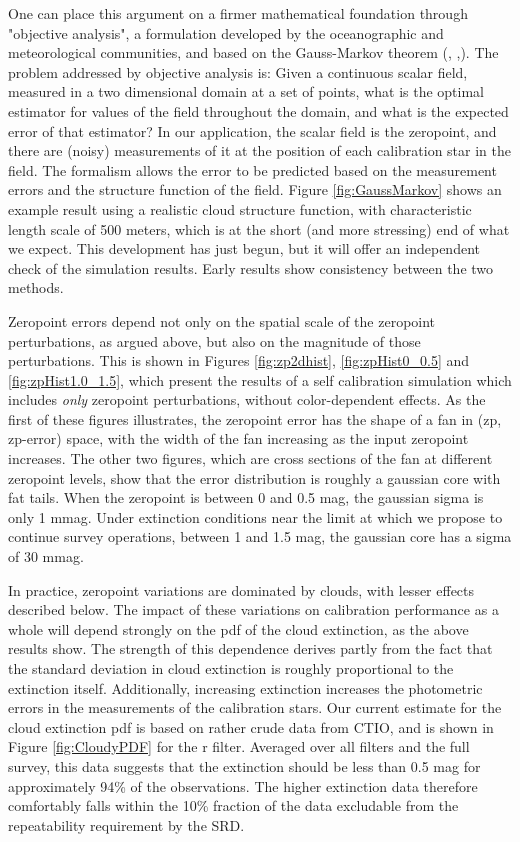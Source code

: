 \documentclass[12pt,preprint]{aastex}
\begin{document}
One can place this argument on a firmer mathematical foundation through "objective analysis", a formulation developed by the 
oceanographic and meteorological communities, and based on the Gauss-Markov theorem (\citep{Bretherton1976}, 
\citep{Bretherton1980},\citep{McIntosh1990}).
The problem addressed by objective analysis is:  Given a continuous scalar field, measured in a two dimensional domain at a set of 
points, what is the optimal estimator for values of the field throughout the domain, and what is the expected error of that estimator?
In our application, the scalar field is the zeropoint, and there are (noisy) measurements of it at the position of each calibration
star in the field.  The formalism allows the error to be predicted based on the measurement errors and the structure function
of the field.  Figure \ref{fig:GaussMarkov} shows an example result using a realistic cloud structure function, with 
characteristic length scale of 500 meters, which is at the short (and more stressing) end of what we expect.  This development
has just begun, but it will offer an independent check of the simulation results.  Early results show consistency between
the two methods.


Zeropoint errors depend not only on the spatial scale of the zeropoint perturbations, as argued above,
but also on the magnitude of those perturbations.   This is shown in Figures \ref{fig:zp2dhist}, \ref{fig:zpHist0_0.5} and 
\ref{fig:zpHist1.0_1.5}, which present
the results of a self calibration simulation which includes {\it only} zeropoint perturbations, without
color-dependent effects.  As the first of these figures illustrates, the zeropoint error has the shape of a fan
in (zp, zp-error) space, with the width of the fan increasing as the input zeropoint increases.  The other two
figures, which are cross sections of the fan at different zeropoint levels, show that the error distribution
is roughly a gaussian core with fat tails.  When the zeropoint is between 0 and 0.5 mag, the gaussian sigma is only
1 mmag.  Under extinction conditions near the limit at which we propose to continue survey operations, between
1 and 1.5 mag, the gaussian core has a sigma of 30 mmag.

In practice, zeropoint variations are dominated by clouds, with lesser effects described below.
The impact of these variations on calibration performance as a whole will depend strongly on
the pdf of the cloud extinction, as the above results show.  The strength of this dependence derives partly from the fact that
the standard deviation in cloud extinction is roughly proportional to the extinction itself.  Additionally, 
increasing extinction increases the photometric errors in the measurements of the
calibration stars.  Our current estimate for the cloud extinction pdf is based on rather crude data from CTIO, and is shown in Figure
\ref{fig:CloudyPDF} for the r filter.  Averaged over all filters and the full survey, this data suggests that the extinction should be 
less than 0.5 mag for approximately 94\% of the observations.
The higher extinction data therefore comfortably falls within the 10\% fraction of the data excludable
from the repeatability requirement by the SRD.
\end{document}
